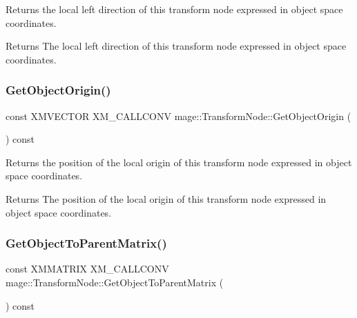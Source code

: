 Returns the local left direction of this transform node expressed in object space coordinates.

\begin{DoxyReturn}{Returns}
The local left direction of this transform node expressed in object space coordinates. 
\end{DoxyReturn}
\hypertarget{classmage_1_1_transform_node_a339dbfb4d5895568988458aaaf6d0595}{}\label{classmage_1_1_transform_node_a339dbfb4d5895568988458aaaf6d0595} 
\subsubsection{\texorpdfstring{Get\+Object\+Origin()}{GetObjectOrigin()}}
{\footnotesize\ttfamily const X\+M\+V\+E\+C\+T\+OR X\+M\+\_\+\+C\+A\+L\+L\+C\+O\+NV mage\+::\+Transform\+Node\+::\+Get\+Object\+Origin (\begin{DoxyParamCaption}{ }\end{DoxyParamCaption}) const\hspace{0.3cm}{\ttfamily [noexcept]}}

Returns the position of the local origin of this transform node expressed in object space coordinates.

\begin{DoxyReturn}{Returns}
The position of the local origin of this transform node expressed in object space coordinates. 
\end{DoxyReturn}
\hypertarget{classmage_1_1_transform_node_a5a033042b5fa230b11533aa7d7001694}{}\label{classmage_1_1_transform_node_a5a033042b5fa230b11533aa7d7001694} 
\subsubsection{\texorpdfstring{Get\+Object\+To\+Parent\+Matrix()}{GetObjectToParentMatrix()}}
{\footnotesize\ttfamily const X\+M\+M\+A\+T\+R\+IX X\+M\+\_\+\+C\+A\+L\+L\+C\+O\+NV mage\+::\+Transform\+Node\+::\+Get\+Object\+To\+Parent\+Matrix (\begin{DoxyParamCaption}{ }\end{DoxyParamCaption}) const\hspace{0.3cm}{\ttfamily [noexcept]}}

